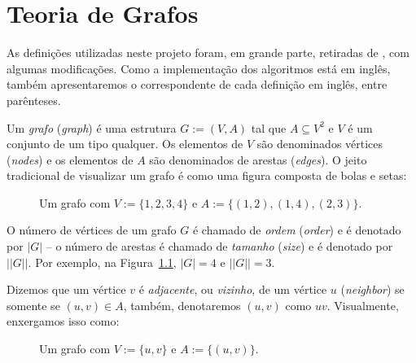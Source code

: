 \chapter{Teoria de Grafos}
\label{ch:teoria}

As definições utilizadas neste projeto foram, em grande parte,
retiradas de \cite{diestel2025graph}, com algumas modificações. Como
a implementação dos algoritmos está em inglês, também apresentaremos
o correspondente de cada definição em inglês, entre parênteses.

\begin{mydef}[Grafo]
  Um \emph{grafo} (\textit{graph}) é uma estrutura $G := (V, A)$
  tal que $A \subseteq V^2$ e $V$ é um conjunto de um tipo qualquer.
  Os elementos de $V$ são denominados vértices (\textit{nodes}) e os
  elementos de $A$ são denominados de arestas
  (\textit{edges}). O jeito tradicional de visualizar um
  grafo é como uma figura composta de bolas e setas:
  \begin{figure}[h]
    \centering
    \caption{Um grafo com $V := \{1,2,3,4\}$ e $A :=
    \{(1,2),(1,4),(2,3)\}.$}
    \label{fig:graph1}
  \end{figure}
  \FloatBarrier
\end{mydef}

\begin{mydef}
  O número de vértices de um grafo $G$ é chamado de \emph{ordem}
  (\textit{order}) e é denotado por $|G|$ -- o número de arestas é chamado de
  \emph{tamanho} (\textit{size}) e é denotado por $||G||$. Por exemplo, na
  Figura~\ref{fig:graph1}, $|G| = 4$ e $||G|| = 3$.
\end{mydef}

\begin{mydef}[Adjacência]
  Dizemos que um vértice $v$ é \emph{adjacente}, ou \emph{vizinho},
  de um vértice
  $u$ (\textit{neighbor}) se somente se $(u,v) \in A$, também,
  denotaremos $(u,v)$ como $uv$. Visualmente,
  enxergamos isso como:
  \begin{figure}[h]
    \centering
    \caption{Um grafo com $V := \{u,v\}$ e $A :=
    \{(u,v)\}.$}
  \end{figure}
  \FloatBarrier
\end{mydef}

